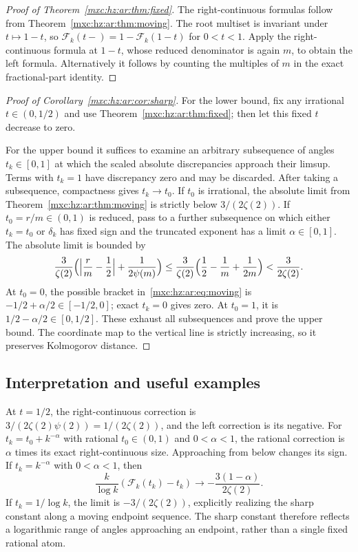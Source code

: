 \documentclass[11pt]{article}
\numberwithin{equation}{section}
\theoremstyle{definition}
\theoremstyle{remark}
\begin{document}
\begin{proof}[Proof of Theorem~\ref{mxc:hz:ar:thm:fixed}]
The right-continuous formulas follow from
Theorem~\ref{mxc:hz:ar:thm:moving}. The root multiset is invariant under
$t\mapsto1-t$, so $\mathcal F_k(t-)=1-\mathcal F_k(1-t)$ for $0<t<1$. Apply
the right-continuous formula at $1-t$, whose reduced denominator is again
$m$, to obtain the left formula. Alternatively it follows by counting the
multiples of $m$ in the exact fractional-part identity.
\end{proof}

\begin{proof}[Proof of Corollary~\ref{mxc:hz:ar:cor:sharp}]
For the lower bound, fix any irrational $t\in(0,1/2)$ and use
Theorem~\ref{mxc:hz:ar:thm:fixed}; then let this fixed $t$ decrease to
zero.

For the upper bound it suffices to examine an arbitrary subsequence of
angles $t_k\in[0,1]$ at which the scaled absolute discrepancies approach
their limsup. Terms with $t_k=1$ have discrepancy zero and may be
discarded. After taking a subsequence, compactness gives $t_k\to t_0$. If
$t_0$ is irrational, the absolute limit from
Theorem~\ref{mxc:hz:ar:thm:moving} is strictly below $3/(2\zeta(2))$. If
$t_0=r/m\in(0,1)$ is reduced, pass to a further subsequence on which
either $t_k=t_0$ or $\delta_k$ has fixed sign and the truncated exponent
has a limit $\alpha\in[0,1]$. The absolute limit is bounded by
\[
 \frac3{\zeta(2)}\Bigl(\Bigl|\frac rm-\frac12\Bigr|+\frac1{2\psi(m)}\Bigr)
 \le\frac3{\zeta(2)}\Bigl(\frac12-\frac1m+\frac1{2m}\Bigr)
 <\frac3{2\zeta(2)}.
\]
At $t_0=0$, the possible bracket in~\eqref{mxc:hz:ar:eq:moving} is
$-1/2+\alpha/2\in[-1/2,0]$; exact $t_k=0$ gives zero. At $t_0=1$, it is
$1/2-\alpha/2\in[0,1/2]$. These exhaust all subsequences and prove the
upper bound. The coordinate map to the vertical line is strictly
increasing, so it preserves Kolmogorov distance.
\end{proof}

\subsection{Interpretation and useful examples}

At $t=1/2$, the right-continuous correction is
$3/(2\zeta(2)\psi(2))=1/(2\zeta(2))$, and the left correction is its
negative. For $t_k=t_0+k^{-\alpha}$ with rational $t_0\in(0,1)$ and
$0<\alpha<1$, the rational correction is $\alpha$ times its exact
right-continuous size. Approaching from below changes its sign. If
$t_k=k^{-\alpha}$ with $0<\alpha<1$, then
\[
 \frac{k}{\log k}(\mathcal F_k(t_k)-t_k)
 \longrightarrow-\frac{3(1-\alpha)}{2\zeta(2)}.
\]
If $t_k=1/\log k$, the limit is $-3/(2\zeta(2))$, explicitly realizing the
sharp constant along a moving endpoint sequence. The sharp constant
therefore reflects a logarithmic range of angles approaching an endpoint,
rather than a single fixed rational atom.
\end{document}
